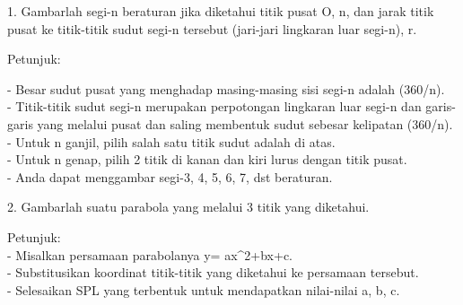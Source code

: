 \documentclass[12pt,arial,letterpaper]{book}
\begin{document}
\begin{eulercomment}
\begin{eulercomment}
\begin{eulercomment}
\begin{eulercomment}
\begin{eulercomment}
\begin{eulercomment}
\begin{eulercomment}
\begin{eulercomment}
\begin{eulercomment}
\begin{eulercomment}
\begin{eulercomment}
\begin{eulercomment}
\begin{eulercomment}
\begin{eulercomment}
\begin{eulercomment}
\begin{eulercomment}
\begin{eulercomment}
\begin{eulercomment}
\begin{eulercomment}
\begin{eulercomment}
\begin{eulercomment}
\begin{eulercomment}
\begin{eulercomment}
\begin{eulercomment}
\begin{eulercomment}
\begin{eulercomment}
\begin{eulercomment}
\begin{eulercomment}
\begin{eulercomment}
\begin{eulercomment}
\begin{eulercomment}
1. Gambarlah segi-n beraturan jika diketahui titik pusat O, n, dan
jarak titik pusat ke titik-titik sudut segi-n tersebut (jari-jari
lingkaran luar segi-n), r.

Petunjuk:

- Besar sudut pusat yang menghadap masing-masing sisi segi-n adalah
(360/n).\\
- Titik-titik sudut segi-n merupakan perpotongan lingkaran luar segi-n
dan garis-garis yang melalui pusat dan saling membentuk sudut sebesar
kelipatan (360/n).\\
- Untuk n ganjil, pilih salah satu titik sudut adalah di atas.\\
- Untuk n genap, pilih 2 titik di kanan dan kiri lurus dengan titik
pusat.\\
- Anda dapat menggambar segi-3, 4, 5, 6, 7, dst beraturan.

2. Gambarlah suatu parabola yang melalui 3 titik yang diketahui.

Petunjuk:\\
- Misalkan persamaan parabolanya y= ax\textasciicircum{}2+bx+c.\\
- Substitusikan koordinat titik-titik yang diketahui ke persamaan
tersebut.\\
- Selesaikan SPL yang terbentuk untuk mendapatkan nilai-nilai a, b, c.


\end{eulercomment}
\end{eulercomment}
\end{eulercomment}
\end{eulercomment}
\end{eulercomment}
\end{eulercomment}
\end{eulercomment}
\end{eulercomment}
\end{eulercomment}
\end{eulercomment}
\end{eulercomment}
\end{eulercomment}
\end{eulercomment}
\end{eulercomment}
\end{eulercomment}
\end{eulercomment}
\end{eulercomment}
\end{eulercomment}
\end{eulercomment}
\end{eulercomment}
\end{eulercomment}
\end{eulercomment}
\end{eulercomment}
\end{eulercomment}
\end{eulercomment}
\end{eulercomment}
\end{eulercomment}
\end{eulercomment}
\end{eulercomment}
\end{eulercomment}
\end{eulercomment}
\end{document}

